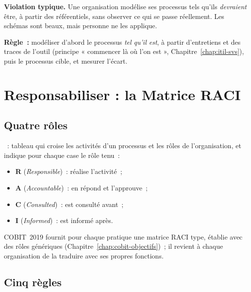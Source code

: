 \begin{boxalert}
\textbf{Violation typique.} Une organisation modélise ses processus tels
qu'ils \emph{devraient} être, à partir des référentiels, sans observer ce
qui se passe réellement. Les schémas sont beaux, mais personne ne les
applique.

\smallskip
\textbf{Règle~:} modéliser d'abord le processus \emph{tel qu'il est}, à
partir d'entretiens et des traces de l'outil (principe « commencer là où
l'on est », Chapitre~\ref{chap:itil-svs}), puis le processus cible, et
mesurer l'écart.
\end{boxalert}

\section{Responsabiliser : la Matrice RACI}
\label{sec:c16-raci}

\subsection{Quatre rôles}

\begin{boxdef}
~: tableau qui croise les
activités d'un processus et les rôles de l'organisation, et indique pour
chaque case le rôle tenu~:
\begin{itemize}
    \item \textbf{R} (\textit{Responsible})~: réalise l'activité~;
    \item \textbf{A} (\textit{Accountable})~: en répond et l'approuve~;
    \item \textbf{C} (\textit{Consulted})~: est consulté avant~;
    \item \textbf{I} (\textit{Informed})~: est informé après.
\end{itemize}
\end{boxdef}

COBIT~2019 fournit pour chaque pratique une matrice RACI type, établie
avec des rôles génériques (Chapitre~\ref{chap:cobit-objectifs})~; il
revient à chaque organisation de la traduire avec ses propres fonctions.

\subsection{Cinq règles}

